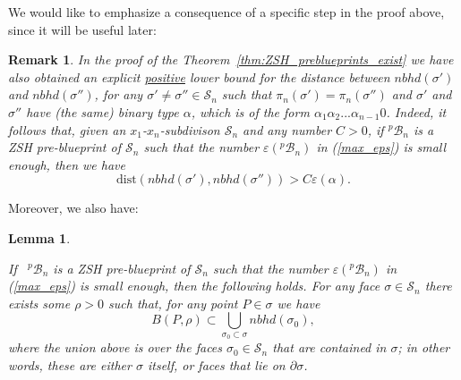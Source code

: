 \documentclass[12pt,letterpaper]{article}
\newtheorem{lem}[thm]{Lemma}
\newtheorem{rem}[thm]{Remark}
\renewcommand{\S}{\mathcal{S}}
\newcommand{\B}{\mathcal{B}}
\newcommand{\eps}{\varepsilon}
\newcommand{\dist}{\mathrm{dist}}
\newcommand{\nbhd}{\mathit{nbhd}}
\renewcommand{\a}{\alpha}
\begin{document}
\bigskip 

\noindent
We would like to emphasize a consequence of a specific step in the proof above, since it will be useful later:


\begin{rem}
\label{rem:large_enough_distance_between_adjacent_faces}
In the proof of the Theorem~\ref{thm:ZSH_preblueprints_exist} we have also obtained an 
explicit \ul{positive} lower bound for the distance between $\nbhd(\sigma')$ and $\nbhd(\sigma'')$, for any $\sigma' \neq \sigma'' \in \S_n$ such that $\pi_n(\sigma') = \pi_n(\sigma'')$ and $\sigma'$ and $\sigma''$ have (the same) binary type $\a$, which is of the form $\a_1\a_2...\a_{n-1}0$. Indeed, it follows that, given an $x_1$-$x_n$-subdivison $\S_n$ and any number $C>0$, 
if  $^p\!\B_n$ is a ZSH pre-blueprint of $\S_n$ such that the number $\eps(^p\!\B_n)$ in (\ref{max_eps}) is small enough,
then we have 
$$
\dist( \nbhd(\sigma'),   \nbhd(\sigma'') ) > C \eps(\a).
$$
\end{rem}



\bigskip 



\noindent
Moreover, we also have:

\begin{lem}
\label{lem:face_is_contained_in_nbhds_of_subfaces}

If \, $^p\!\B_n$ is a ZSH pre-blueprint of $\S_n$ such that the number $\eps(^p\!\B_n)$ in (\ref{max_eps}) is small enough,
then the following holds. For any face $\sigma \in \S_n$ there exists some $\rho>0$ such that, for any point $P \in \sigma$ we have 
%
\begin{equation}
\label{eqn:neighborhood_inside_union_of_nbhds}
B(P, \rho) \subset \bigcup_{\sigma_0 \subset \sigma} \nbhd(\sigma_0),
\end{equation}
%
where the union above is over the faces $\sigma_0 \in \S_n$ that are contained in $\sigma$; in other words, these are either $\sigma$ itself, or faces that lie on $\partial \sigma$.
\end{lem}
\end{document}
